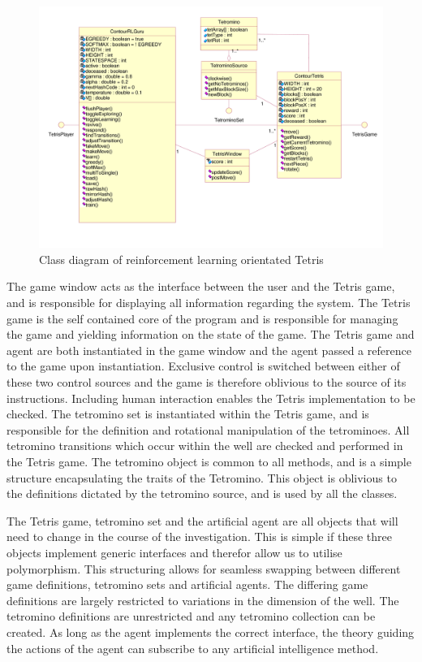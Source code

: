 \documentclass{rucsthesis}
\begin{document}
\begin{figure}[h]
\centering
\includegraphics[width=6in]{finaluml.png}
\caption{Class diagram of reinforcement learning orientated Tetris}
\label{fig:uml}
\end{figure}

The game window acts as the interface between the user and the Tetris game, and is responsible for displaying all information regarding the system. The Tetris game is the self contained core of the program and is responsible for managing the game and yielding information on the state of the game. The Tetris game and agent are both instantiated in the game window and the agent passed a reference to the game upon instantiation. Exclusive control is switched between either of these two control sources and the game is therefore oblivious to the source of its instructions.  Including human interaction enables the Tetris implementation to be checked. The tetromino set is instantiated within the Tetris game, and is responsible for the definition and rotational manipulation of the tetrominoes. All tetromino transitions which occur within the well are checked and performed in the Tetris game. The tetromino object is common to all methods, and is a simple structure encapsulating the traits of the Tetromino. This object is oblivious to the definitions dictated by the tetromino source, and is used by all the classes.

The Tetris game, tetromino set and the artificial agent are all objects that will need to change in the course of the investigation. This is simple if these three objects implement generic interfaces and therefor allow us to utilise polymorphism. This structuring allows for seamless swapping between different game definitions, tetromino sets and artificial agents. The differing game definitions are largely restricted to variations in the dimension of the well. The tetromino definitions are unrestricted and any tetromino collection can be created. As long as the agent implements the correct interface, the theory guiding the actions of the agent can subscribe to any artificial intelligence method.
\end{document}
